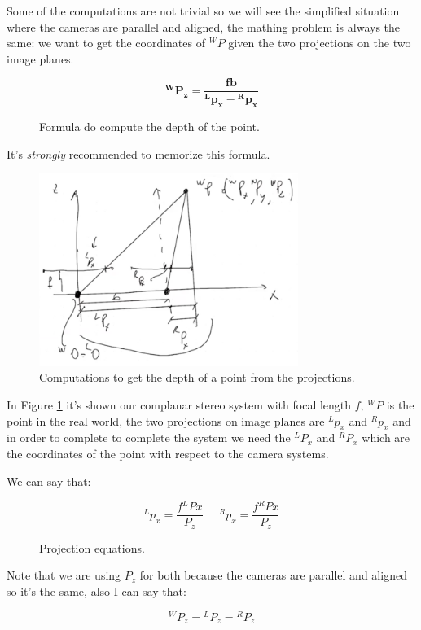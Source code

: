 Some of the computations are not trivial so we will see the simplified situation where the cameras are parallel and aligned, the mathing problem is always the same: we want to get the coordinates of \({}^WP\) given the two projections on the two image planes.

\begin{figure}[H]
\[
        \bm{{}^WP_z = \frac{fb}{{}^Lp_x-{}^Rp_x}}
\]
\caption{Formula do compute the depth of the point.}
\end{figure}

It's \textit{strongly} recommended to memorize this formula.

\begin{figure}[H]
    \centering
    \includegraphics[width=0.75\textwidth]{Figures/epi_comp.png}
    \caption{Computations to get the depth of a point from the projections.}
    \label{fig:epi_comp}
\end{figure}

In Figure \ref{fig:epi_comp} it's shown our complanar stereo system with focal length \(f\), \({}^WP\) is the point in the real world, the two projections on image planes are \({}^Lp_x\) and \({}^Rp_x\) and in order to complete to complete the system we need the \({}^LP_x\) and \({}^RP_x\) which are the coordinates of the point with respect to the camera systems. 

We can say that: 

\begin{figure}[H]    
\[
    {}^Lp_x = \frac{f{}^LPx}{P_z}\;\;\;\;\;   
    {}^Rp_x = \frac{f{}^RPx}{P_z}  
\]
\caption{Projection equations.}
\label{eq:proj}
\end{figure}
Note that we are using \(P_z\) for both because the cameras are parallel and aligned so it's the same, also I can say that:

\[
    {}^WP_z = {}^LP_z = {}^RP_z
\]

